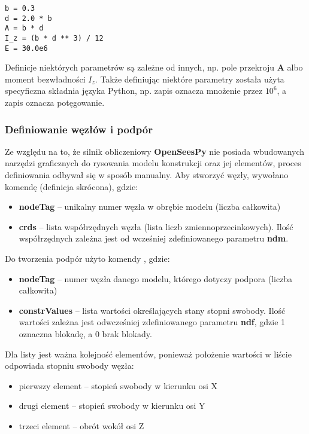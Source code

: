 \begin{lstlisting}
b = 0.3
d = 2.0 * b
A = b * d
I_z = (b * d ** 3) / 12
E = 30.0e6
\end{lstlisting}

Definicje niektórych parametrów są zależne od innych, np. pole przekroju \textbf{A} albo moment bezwładności \textbf{$I_z$}.
Także definiując niektóre parametry została użyta specyficzna składnia języka Python, np. zapis  oznacza mnożenie
przez \textbf{$10^6$}, a zapis \ilc{**} oznacza potęgowanie.

\subsubsection{Definiowanie węzłów i podpór}

Ze względu na to, że silnik obliczeniowy \textbf{OpenSeesPy} nie posiada wbudowanych narzędzi graficznych do rysowania
modelu konstrukcji oraz jej elementów, proces definiowania odbywał się w sposób manualny.
Aby stworzyć węzły, wywołano komendę  (definicja skrócona), gdzie:

\begin{itemize}
    \item \textbf{nodeTag} – unikalny numer węzła w obrębie modelu (liczba całkowita)
    \item \textbf{crds} – lista współrzędnych węzła (lista liczb zmiennoprzecinkowych). Ilość współrzędnych zależna jest od wcześniej zdefiniowanego parametru \textbf{ndm}.
\end{itemize}

Do tworzenia podpór użyto komendy , gdzie:

\begin{itemize}
    \item \textbf{nodeTag} – numer węzła danego modelu, którego dotyczy podpora (liczba całkowita)
    \item \textbf{constrValues} – lista wartości określających stany stopni swobody. Ilość wartości zależna jest odwcześniej zdefiniowanego parametru \textbf{ndf}, gdzie 1 oznaczna blokadę, a 0 brak blokady.
\end{itemize}

Dla listy  jest ważna kolejność elementów, ponieważ położenie wartości w liście odpowiada stopniu swobody węzła:
\begin{itemize}
    \item pierwszy element – stopień swobody w kierunku osi X
    \item drugi element – stopień swobody w kierunku osi Y
    \item trzeci element – obrót wokół osi Z
\end{itemize}

